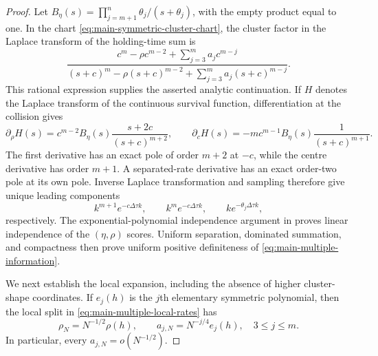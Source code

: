\begin{proof}
Let \(B_\eta(s)=\prod_{j=m+1}^n\theta_j/(s+\theta_j)\), with the empty
product equal to one.  In the chart
\eqref{eq:main-symmetric-cluster-chart}, the cluster factor in the Laplace
transform of the holding-time sum is
\begin{equation}
 \frac{c^m-\rho c^{m-2}+\sum_{j=3}^m a_jc^{m-j}}
 {(s+c)^m-\rho(s+c)^{m-2}
   +\sum_{j=3}^m a_j(s+c)^{m-j}}.
\label{eq:main-multiple-cluster-transform}
\end{equation}
This rational expression supplies the asserted analytic continuation.  If
\(H\) denotes the Laplace transform of the continuous survival function,
differentiation at the collision gives
\begin{equation}
 \partial_\rho H(s)
 =c^{m-2}B_\eta(s)\frac{s+2c}{(s+c)^{m+2}},
 \qquad
 \partial_cH(s)=-mc^{m-1}B_\eta(s)\frac1{(s+c)^{m+1}}.
\label{eq:main-multiple-transform-derivatives}
\end{equation}
The first derivative has an exact pole of order \(m+2\) at \(-c\), while
the centre derivative has order \(m+1\).  A separated-rate derivative has
an exact order-two pole at its own pole.  Inverse Laplace transformation and
sampling therefore give unique leading components
\begin{equation}
 k^{m+1}e^{-c\Delta\tau k},\qquad
 k^me^{-c\Delta\tau k},\qquad
 ke^{-\theta_j\Delta\tau k},
\label{eq:main-multiple-distinguishing-components}
\end{equation}
respectively.  The exponential-polynomial independence argument in
 proves linear independence
of the \((\eta,\rho)\) scores.  Uniform separation, dominated summation, and
compactness then prove uniform positive definiteness of
\eqref{eq:main-multiple-information}.

We next establish the local expansion, including the absence of higher
cluster-shape coordinates.  If \(e_j(h)\) is the \(j\)th elementary
symmetric polynomial, then the local split in
\eqref{eq:main-multiple-local-rates} has
\begin{equation}
 \rho_N=N^{-1/2}\rho(h),\qquad
 a_{j,N}=N^{-j/4}e_j(h),\quad 3\le j\le m.
\label{eq:main-multiple-coordinate-scales}
\end{equation}
In particular, every \(a_{j,N}=o(N^{-1/2})\).


\end{proof}
